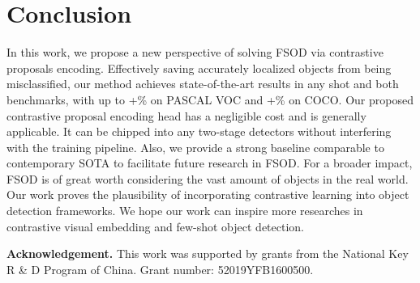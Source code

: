 \documentclass[final]{cvpr}
\begin{document}
\vspace{-2mm}
\section{Conclusion}
\vspace{-2mm}
In this work, we propose a new perspective of solving FSOD via contrastive proposals encoding. Effectively saving accurately localized objects from being misclassified, our method achieves state-of-the-art results in any shot and both benchmarks, with up to +\% on PASCAL VOC and +\% on COCO. Our proposed contrastive proposal encoding head has a negligible cost and is generally applicable. It can be chipped into any two-stage detectors without interfering with the training pipeline. Also, we provide a strong baseline comparable to contemporary SOTA to facilitate future research in FSOD. 
For a broader impact, FSOD is of great worth considering the vast amount of objects in the real world. Our work proves the plausibility of incorporating contrastive learning into object detection frameworks. We hope our work can inspire more researches in contrastive visual embedding and few-shot object detection.

\textbf{Acknowledgement.} This work was supported by grants from the National Key R \& D Program of China. Grant number: 52019YFB1600500. 



{\small



}
\end{document}
